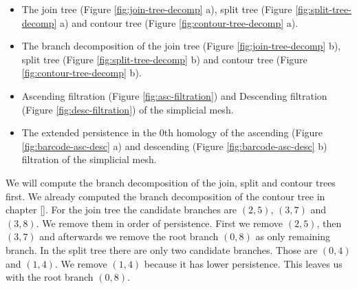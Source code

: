 \begin{itemize}

    \item The join tree (Figure \ref{fig:join-tree-decomp} a), split tree (Figure \ref{fig:split-tree-decomp} a) and contour tree (Figure \ref{fig:contour-tree-decomp} a).

    \item The branch decomposition of the join tree (Figure \ref{fig:join-tree-decomp} b), split tree (Figure \ref{fig:split-tree-decomp} b) and contour tree (Figure \ref{fig:contour-tree-decomp} b).

    \item Ascending filtration (Figure \ref{fig:asc-filtration}) and Descending filtration (Figure \ref{fig:desc-filtration}) of the simplicial mesh.


    \item The extended persistence in the 0th homology of the ascending (Figure \ref{fig:barcode-asc-desc} a) and descending (Figure \ref{fig:barcode-asc-desc} b) filtration of the simplicial mesh.


\end{itemize}

We will compute the branch decomposition of the join, split and contour trees first. We already computed the branch decomposition of the contour tree in chapter []. For the join tree the candidate branches are $(2, 5)$, $(3, 7)$ and $(3, 8)$. We remove them in order of persistence. First we remove $(2, 5)$, then $(3, 7)$ and afterwards we remove the root branch $(0, 8)$ as only remaining branch. In the split tree there are only two candidate branches. Those are $(0, 4)$ and $(1, 4)$. We remove $(1, 4)$ because it has lower persistence. This leaves us with the root branch $(0, 8)$.

